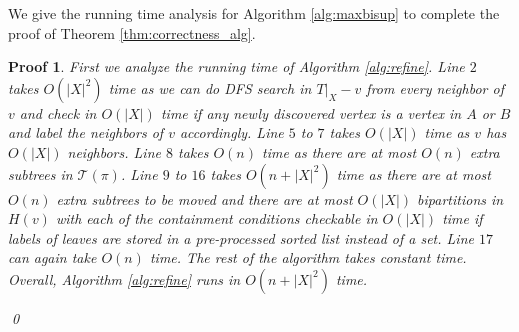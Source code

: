 \documentclass{bmcart}
\theoremstyle{mystyle}
\theoremstyle{proofstyle}
\newtheorem*{proof2}{Proof}
\newenvironment{proofnospace}{\begin{proof2}}{\qed \end{proof2}}
\begin{document}
We give the running time analysis for Algorithm \ref{alg:maxbisup} to complete the proof of Theorem \ref{thm:correctness_alg}.
\begin{proofnospace}
First we analyze the running time of Algorithm \ref{alg:refine}. Line $2$ takes $O(|X|^2)$ time as we can do DFS search in $T|_X - v$ from every neighbor of $v$ and check in $O(|X|)$ time if any newly discovered vertex is a vertex in $A$ or $B$ and label the neighbors of $v$ accordingly. Line $5$ to $7$ takes $O(|X|)$ time as $v$ has $O(|X|)$ neighbors. Line $8$ takes $O(n)$ time as there are at most $O(n)$ extra subtrees in $\mathcal{T}(\pi)$. Line $9$ to $16$ takes $O(n+|X|^2 )$ time as there are at most $O(n)$ extra subtrees to be moved and there are at most $O(|X|)$ bipartitions in $H(v)$ with each of the containment conditions checkable in $O(|X|)$ time if labels of leaves are stored in a pre-processed sorted list instead of a set. Line $17$ can again take $O(n)$ time. The rest of the algorithm takes constant time. Overall, Algorithm \ref{alg:refine} runs in $O(n + |X|^2)$ time.\smallskip


\end{proofnospace}
\end{document}
